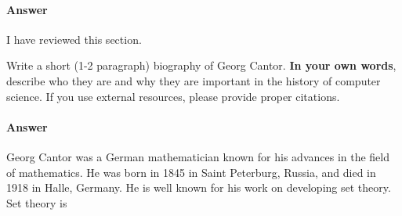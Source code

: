 \documentclass{article}
\begin{document}
\paragraph{Answer}

I have reviewed this section.


\collab{\todo{}}

Write a short (1-2 paragraph) biography of Georg Cantor.
\textbf{In your own words}, describe who they are and why they are important in
the history of computer science.  If you use external resources, please provide
proper citations.

\paragraph{Answer}


Georg Cantor was a German mathematician known for his advances in the field of mathematics. He was born in 1845 in Saint Peterburg, Russia, and died in 1918 in Halle, Germany. He is well known for his work on developing set theory. Set theory is 

\end{document}
